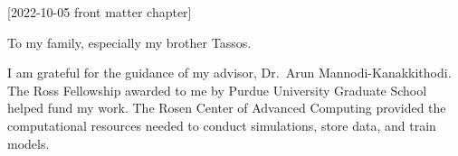 [2022-10-05 front matter chapter]
%
%
%
%
%
%

%
%
%
\begin{statement}
\end{statement}

\begin{dedication}
  To my family, especially my brother Tassos.
\end{dedication}

\begin{acknowledgments}
  I am grateful for the guidance of my advisor, Dr.~Arun
  Mannodi-Kanakkithodi.
  The Ross Fellowship awarded to me by Purdue University Graduate
  School helped fund my work.
  The Rosen Center of Advanced Computing provided the computational
  resources needed to conduct simulations, store data, and train models.
\end{acknowledgments}



